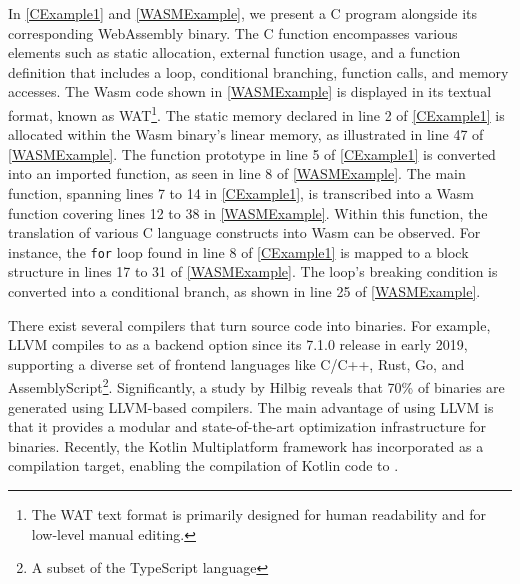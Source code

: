 In \autoref{CExample1} and \autoref{WASMExample}, we present a C program alongside its corresponding WebAssembly binary. 
The C function encompasses various elements such as static allocation, external function usage, and a function definition that includes a loop, conditional branching, function calls, and memory accesses.
The Wasm code shown in \autoref{WASMExample} is displayed in its textual format, known as WAT\footnote{The WAT text format is primarily designed for human readability and for low-level manual editing.}.
The static memory declared in line 2 of \autoref{CExample1} is allocated within the Wasm binary's linear memory, as illustrated in line 47 of \autoref{WASMExample}.
The function prototype in line 5 of \autoref{CExample1} is converted into an imported function, as seen in line 8 of \autoref{WASMExample}.
The main function, spanning lines 7 to 14 in \autoref{CExample1}, is transcribed into a Wasm function covering lines 12 to 38 in \autoref{WASMExample}. Within this function, the translation of various C language constructs into Wasm can be observed.
For instance, the \texttt{for} loop found in line 8 of \autoref{CExample1} is mapped to a block structure in lines 17 to 31 of \autoref{WASMExample}. 
The loop's breaking condition is converted into a conditional branch, as shown in line 25 of \autoref{WASMExample}.


There exist several compilers that turn source code into \Wasm binaries. 
For example, LLVM compiles to \Wasm as a backend option since its 7.1.0 release in early 2019, supporting a diverse set of frontend languages like C/C++, Rust, Go, and AssemblyScript\footnote{A subset of the TypeScript language}.
Significantly, a study by Hilbig \cite{Hilbig2021AnES} reveals that 70\% of \Wasm binaries are generated using LLVM-based compilers. 
The main advantage of using LLVM is that it provides a modular and state-of-the-art optimization infrastructure for \Wasm binaries.
Recently, the Kotlin Multiplatform framework  has incorporated \Wasm as a compilation target, enabling the compilation of Kotlin code to \Wasm.



